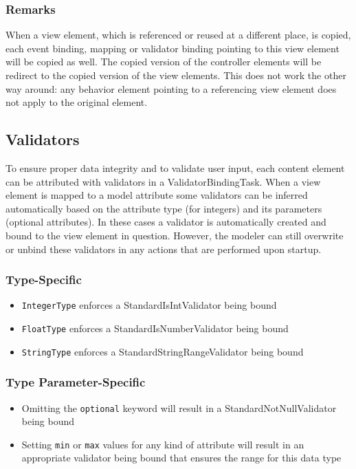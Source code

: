 \subsubsection{Remarks}
When a view element, which is referenced or reused at a different place, is copied, each event binding, mapping or validator binding pointing to this view element will be copied as well. The copied version of the controller elements will be redirect to the copied version of the view elements. This does not work the other way around: any behavior element pointing to a referencing view element does not apply to the original element.

\subsection{Validators}
To ensure proper data integrity and to validate user input, each content element can be attributed with validators in a ValidatorBindingTask. When a view element is mapped to a model attribute some validators can be inferred automatically based on the attribute type (\eg for integers) and its parameters (\eg optional attributes). In these cases a validator is automatically created and bound to the view element in question. However, the modeler can still overwrite or unbind these validators in any actions that are performed upon startup.

\subsubsection{Type-Specific}
\begin{itemize}
\item \lstinline!IntegerType! enforces a StandardIsIntValidator being bound
\item \lstinline!FloatType! enforces a StandardIsNumberValidator being bound
\item \lstinline!StringType! enforces a StandardStringRangeValidator being bound
\end{itemize}

\subsubsection{Type Parameter-Specific}

\begin{itemize}
\item Omitting the \lstinline!optional! keyword will result in a StandardNotNullValidator being bound
\item Setting \lstinline!min! or \lstinline!max! values for any kind of attribute will result in an appropriate validator being bound that ensures the range for this data type
\end{itemize}


